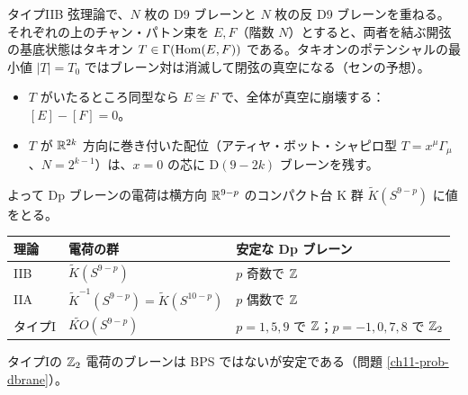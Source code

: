 \begin{physbox}
タイプIIB 弦理論で、$N$ 枚の D9 ブレーンと $N$ 枚の反 D9 ブレーンを重ねる。それぞれの上のチャン・パトン束を $E,F$（階数 $N$）とすると、両者を結ぶ開弦の基底状態はタキオン $T\in\Gamma(\operatorname{Hom}(E,F))$ である。タキオンのポテンシャルの最小値 $\lvert T\rvert=T_0$ ではブレーン対は消滅して閉弦の真空になる（センの予想）。
\begin{itemize}
\item $T$ がいたるところ同型なら $E\cong F$ で、全体が真空に崩壊する：$[E]-[F]=0$。
\item $T$ が $\mathbb{R}^{2k}$ 方向に巻き付いた配位（アティヤ・ボット・シャピロ型 $T=x^\mu\Gamma_\mu$、$N=2^{k-1}$）は、$x=0$ の芯に D$(9-2k)$ ブレーンを残す。
\end{itemize}
よって Dp ブレーンの電荷は横方向 $\mathbb{R}^{9-p}$ のコンパクト台 K 群 $\tilde K(S^{9-p})$ に値をとる。
\begin{center}
\small
\begin{tabular}{l|l|l}
理論 & 電荷の群 & 安定な Dp ブレーン\\ \hline
IIB & $\tilde K(S^{9-p})$ & $p$ 奇数で $\mathbb{Z}$\\
IIA & $\tilde K^{-1}(S^{9-p})=\tilde K(S^{10-p})$ & $p$ 偶数で $\mathbb{Z}$\\
タイプI & $\widetilde{KO}(S^{9-p})$ & $p=1,5,9$ で $\mathbb{Z}$；$p=-1,0,7,8$ で $\mathbb{Z}_2$
\end{tabular}
\end{center}
タイプIの $\mathbb{Z}_2$ 電荷のブレーンは BPS ではないが安定である（問題 \ref{ch11-prob-dbrane}）。
\end{physbox}

